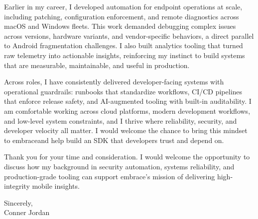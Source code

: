 \documentclass[letterpaper,11pt]{article}
\newcommand{\companyname}{embrace}
\begin{document}
\vspace{16pt}

Earlier in my career, I developed automation for endpoint operations at scale, including patching, configuration enforcement, and remote diagnostics across macOS and Windows fleets. This work demanded debugging complex issues across versions, hardware variants, and vendor-specific behaviors, a direct parallel to Android fragmentation challenges. I also built analytics tooling that turned raw telemetry into actionable insights, reinforcing my instinct to build systems that are measurable, maintainable, and useful in production.

\vspace{16pt}

Across roles, I have consistently delivered developer-facing systems with operational guardrails: runbooks that standardize workflows, CI/CD pipelines that enforce release safety, and AI-augmented tooling with built-in auditability. I am comfortable working across cloud platforms, modern development workflows, and low-level system constraints, and I thrive where reliability, security, and developer velocity all matter. I would welcome the chance to bring this mindset to \companyname and help build an SDK that developers trust and depend on.

\vspace{16pt}

Thank you for your time and consideration. I would welcome the opportunity to discuss how my background in security automation, systems reliability, and production-grade tooling can support \companyname's mission of delivering high-integrity mobile insights.

\vspace{16pt}

Sincerely,\\
Conner Jordan
\end{document}
